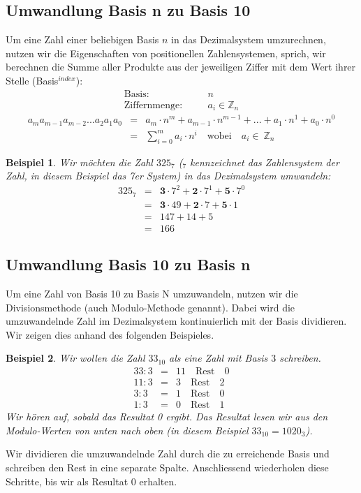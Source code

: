 \documentclass[a4paper,10pt]{report}
\newtheorem{myexample}{Beispiel}
\begin{document}
\subsection{Umwandlung Basis n zu Basis 10}
Um eine Zahl einer beliebigen Basis $n$ in das Dezimalsystem umzurechnen, nutzen wir die Eigenschaften von positionellen Zahlensystemen, sprich, wir berechnen die Summe aller Produkte aus der jeweiligen Ziffer mit dem Wert ihrer Stelle (Basis$^{index}$):
\begin{eqnarray*}\mbox{Basis}:&\quad& n \nonumber \\
\mbox{Ziffernmenge}:&\quad&a_i \in \mathbb{Z}_n\end{eqnarray*}
\begin{eqnarray*}a_m a_{m-1} a_{m-2} ... a_2 a_1 a_0 &=&a_m \cdot n^m + a_{m-1} \cdot n^{m-1} + ... + a_1 \cdot n^1 + a_0 \cdot n^0 \nonumber \\
&=&\sum_{i=0}^{m} a_i \cdot n^i \quad \mbox{wobei}\quad a_i \in\ \mathbb{Z}_n\end{eqnarray*}
\begin{myexample}Wir möchten die Zahl $325_{7}$ ($_7$ kennzeichnet das Zahlensystem der Zahl, in diesem Beispiel das 7er System) in das Dezimalsystem umwandeln:
\begin{eqnarray*}
325_7 &=& \boldsymbol{3} \cdot 7^2 + \boldsymbol{2} \cdot 7^1 + \boldsymbol{5} \cdot 7^0 \\
&=& \boldsymbol{3} \cdot 49 + \boldsymbol{2} \cdot 7 + \boldsymbol{5} \cdot 1\\
&=& 147 + 14 + 5\\
&=& 166
\end{eqnarray*}
\end{myexample}
\subsection{Umwandlung Basis 10 zu Basis n}
Um eine Zahl von Basis 10 zu Basis N umzuwandeln, nutzen wir die Divisionsmethode (auch Modulo-Methode genannt). Dabei wird die umzuwandelnde Zahl im Dezimalsystem kontinuierlich mit der Basis dividieren. Wir zeigen dies anhand des folgenden Beispieles.
\begin{myexample}Wir wollen die Zahl $33_{10}$ als eine Zahl mit Basis $3$ schreiben.
\begin{eqnarray*}
33 : 3 &=& 11 \quad \mbox{Rest} \quad 0 \nonumber \\
11 : 3 &=& 3 \quad \mbox{Rest} \quad 2 \nonumber \\
3 : 3 &=& 1 \quad \mbox{Rest} \quad 0 \nonumber \\
1 : 3 &=& 0 \quad \mbox{Rest} \quad 1\end{eqnarray*}
Wir hören auf, sobald das Resultat 0 ergibt. Das Resultat lesen wir aus den Modulo-Werten von unten nach oben (in diesem Beispiel $33_{10} = 1020_3$).
\end{myexample}
\noindent Wir dividieren die umzuwandelnde Zahl durch die zu erreichende Basis und schreiben den Rest in eine separate Spalte. Anschliessend wiederholen diese Schritte, bis wir als Resultat 0 erhalten.
\end{document}

